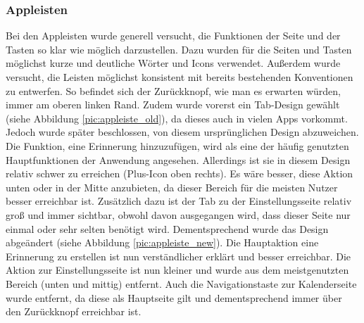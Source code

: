 \subsubsection{Appleisten}
Bei den Appleisten wurde generell versucht, die Funktionen der Seite und der Tasten so klar wie möglich darzustellen. %
	Dazu wurden für die Seiten und Tasten möglichst kurze und deutliche Wörter und Icons verwendet. %
	Außerdem wurde versucht, die Leisten möglichst konsistent mit bereits bestehenden Konventionen zu entwerfen. So befindet sich der Zurückknopf, wie man es erwarten würden, immer am oberen linken Rand. Zudem wurde vorerst ein \glqq Tab-Design\grqq{} gewählt (siehe Abbildung \ref{pic:appleiste_old}), da dieses auch in vielen Apps vorkommt.\newline%
	Jedoch wurde später beschlossen, von diesem ursprünglichen Design abzuweichen. Die Funktion, eine Erinnerung hinzuzufügen, wird als eine der häufig genutzten Hauptfunktionen der Anwendung angesehen. Allerdings ist sie in diesem Design relativ schwer zu erreichen (Plus-Icon oben rechts). Es wäre besser, diese Aktion unten oder in der Mitte anzubieten, da dieser Bereich für die meisten Nutzer besser erreichbar ist\cite{konventionen_platforms_ios}. Zusätzlich dazu ist der Tab zu der Einstellungsseite relativ groß und immer sichtbar, obwohl davon ausgegangen wird, dass dieser Seite nur einmal oder sehr selten benötigt wird.\newline%
	Dementsprechend wurde das Design abgeändert (siehe Abbildung \ref{pic:appleiste_new}). Die Hauptaktion eine Erinnerung zu erstellen ist nun verständlicher erklärt und besser erreichbar. Die Aktion zur Einstellungsseite ist nun kleiner und wurde aus dem meistgenutzten Bereich (unten und mittig) entfernt. Auch die Navigationstaste zur Kalenderseite wurde entfernt, da diese als Hauptseite gilt und dementsprechend immer über den Zurückknopf erreichbar ist.
	

